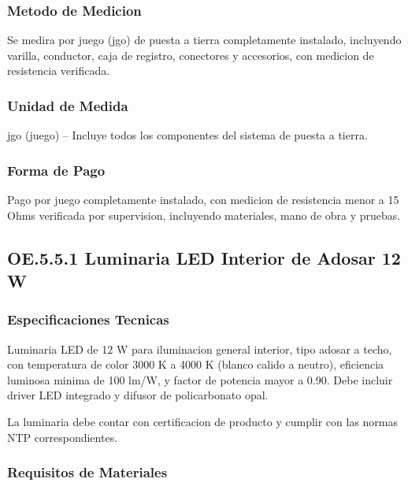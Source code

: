 \subsubsection{Metodo de Medicion}

Se medira por juego (jgo) de puesta a tierra completamente instalado, incluyendo varilla, conductor, caja de registro, conectores y accesorios, con medicion de resistencia verificada.

\subsubsection{Unidad de Medida}

jgo (juego) -- Incluye todos los componentes del sistema de puesta a tierra.

\subsubsection{Forma de Pago}

Pago por juego completamente instalado, con medicion de resistencia menor a 15 Ohms verificada por supervision, incluyendo materiales, mano de obra y pruebas.

\subsection{OE.5.5.1 Luminaria LED Interior de Adosar 12 W}

\subsubsection{Especificaciones Tecnicas}

Luminaria LED de 12 W para iluminacion general interior, tipo adosar a techo, con temperatura de color 3000 K a 4000 K (blanco calido a neutro), eficiencia luminosa minima de 100 lm/W, y factor de potencia mayor a 0.90. Debe incluir driver LED integrado y difusor de policarbonato opal.

La luminaria debe contar con certificacion de producto y cumplir con las normas NTP correspondientes.

\subsubsection{Requisitos de Materiales}

